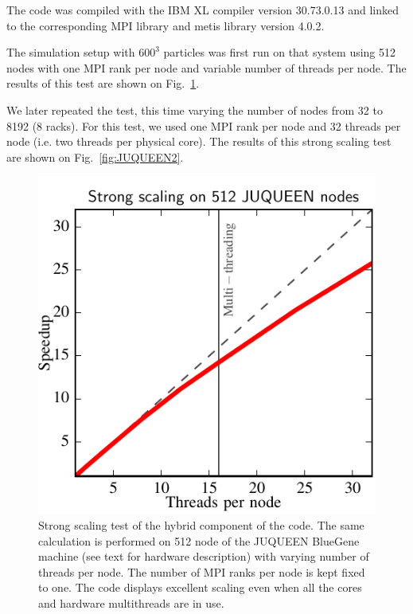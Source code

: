 \documentclass{sig-alternate-05-2015}
\begin{document}
The code was compiled with the IBM XL compiler version \textsc{30.73.0.13} and
linked to the corresponding MPI library and metis library
version \textsc{4.0.2}.

The simulation setup with $600^3$ particles was first run on that system using
512 nodes with one MPI rank per node and variable number of threads per
node. The results of this test are shown on Fig.~\ref{fig:JUQUEEN1}.

We later repeated the test, this time varying the number of nodes from 32 to
8192 (8 racks).  For this test, we used one MPI rank per node and 32 threads per
node (i.e. two threads per physical core). The results of this strong scaling
test are shown on Fig.~\ref{fig:JUQUEEN2}.


\begin{figure}
\centering
\includegraphics[width=\columnwidth]{Figures/scalingInNode}
\caption{Strong scaling test of the hybrid component of the code. The
  same calculation is performed on 512 node of the JUQUEEN BlueGene
  machine (see text for hardware description) with varying number of
  threads per node. The number of MPI ranks per node is kept fixed to
  one. The code displays excellent scaling even when all the cores and
  hardware multithreads are in use. \label{fig:JUQUEEN1}}
\end{figure}  
\end{document}
